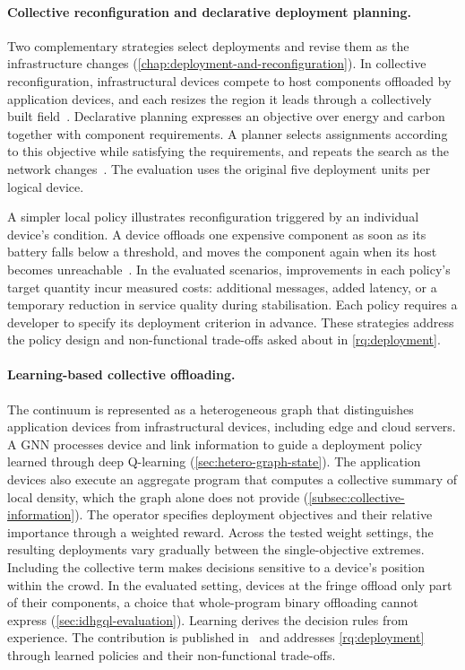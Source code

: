\paragraph{Collective reconfiguration and declarative deployment planning.}
Two complementary strategies select deployments and revise them as the infrastructure changes (\cref{chap:deployment-and-reconfiguration}).
%
In collective reconfiguration, infrastructural devices compete to host components offloaded by application devices,
and each resizes the region it leads through a collectively built field~\cite{DBLP:journals/iot/FarabegoliPCV24}.
%
Declarative planning expresses an objective over energy and carbon together with component requirements.
A planner selects assignments according to this objective while satisfying the requirements,
and repeats the search as the network changes~\cite{DBLP:conf/coordination/BrogiCFFV25}.
The evaluation uses the original five deployment units per logical device.

A simpler local policy illustrates reconfiguration triggered by an individual device's condition.
A device offloads one expensive component as soon as its battery falls below a threshold,
and moves the component again when its host becomes unreachable~\cite{DBLP:conf/acsos/FarabegoliVC24}.
%
In the evaluated scenarios, improvements in each policy's target quantity incur measured costs:
additional messages, added latency, or a temporary reduction in service quality during stabilisation.
%
Each policy requires a developer to specify its deployment criterion in advance.
%
These strategies address the policy design and non-functional trade-offs asked about in \cref{rq:deployment}.

\paragraph{Learning-based collective offloading.}
The continuum is represented as a heterogeneous graph that distinguishes application devices from infrastructural devices,
including edge and cloud servers.
%
A \ac{GNN} processes device and link information to guide a deployment policy learned through deep Q-learning (\cref{sec:hetero-graph-state}).
%
The application devices also execute an aggregate program that computes a collective summary of local density,
which the graph alone does not provide (\cref{subsec:collective-information}).
%
The operator specifies deployment objectives and their relative importance through a weighted reward.
Across the tested weight settings, the resulting deployments vary gradually between the single-objective extremes.
%
Including the collective term makes decisions sensitive to a device's position within the crowd.
In the evaluated setting, devices at the fringe offload only part of their components,
a choice that whole-program binary offloading cannot express (\cref{sec:idhgql-evaluation}).
%
Learning derives the decision rules from experience.
%
The contribution is published in~\cite{Farabegoli:2026:HeteroGNN}
and addresses \cref{rq:deployment} through learned policies and their non-functional trade-offs.

